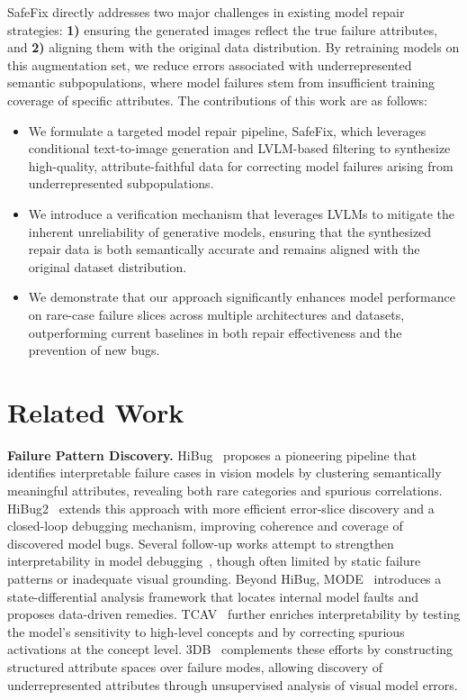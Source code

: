 \documentclass[10pt]{article} %
\newcommand{\model}{SafeFix\xspace}
\newcommand{\hibug}{HiBug\xspace}
\begin{document}
\model directly addresses two major challenges in existing model repair strategies: {\bf 1)} ensuring the generated images reflect the true failure attributes, and {\bf 2)} aligning them with the original data distribution. By retraining models on this augmentation set, we reduce errors associated with underrepresented semantic subpopulations, where model failures stem from insufficient training coverage of specific attributes. The contributions of this work are as follows:
\begin{itemize}
\item We formulate a targeted model repair pipeline, \model, which leverages conditional text-to-image generation and LVLM-based filtering to synthesize high-quality, attribute-faithful data for correcting model failures arising from underrepresented subpopulations.

\item We introduce a  verification mechanism that leverages LVLMs to mitigate the inherent unreliability of generative models, ensuring that the synthesized repair data is both semantically accurate and remains aligned with the original dataset distribution.

\item We demonstrate that our approach significantly enhances model performance on rare-case failure slices across multiple architectures and datasets, outperforming current baselines in both repair effectiveness and the prevention of new bugs.
\end{itemize}

\section{Related Work}
\textbf{Failure Pattern Discovery.} \hibug~\citep{chen2023hibug} proposes a pioneering pipeline that identifies interpretable failure cases in vision models by clustering semantically meaningful attributes, revealing both rare categories and spurious correlations.
HiBug2~\citep{chen2025hibug2} extends this approach with more efficient error-slice discovery and a closed-loop debugging mechanism, improving coherence and coverage of discovered model bugs.
Several follow-up works attempt to strengthen interpretability in model debugging~\citep{adebayo2020debugging, adebayo2022posthoc}, though often limited by static failure patterns or inadequate visual grounding.
Beyond \hibug, MODE~\citep{vendrow2023dataset} introduces a state-differential analysis framework that locates internal model faults and proposes data-driven remedies.
TCAV~\citep{kim2018tcav} further enriches interpretability by testing the model’s sensitivity to high-level concepts and by correcting spurious activations at the concept level. 3DB~\citep{leclerc20223db} complements these efforts by constructing structured attribute spaces over failure modes, allowing discovery of underrepresented attributes through unsupervised analysis of visual model errors.
\end{document}
